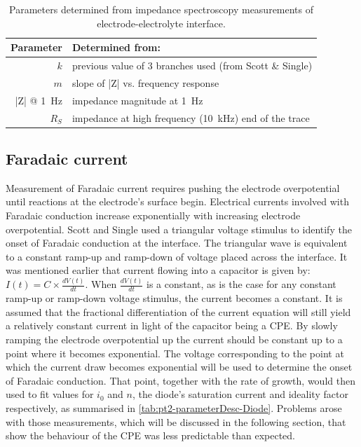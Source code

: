     \begin{table}
      \begin{center}
        \begin{tabular} {r | l}
          Parameter & Determined from:\\
          \hline
          $k$ & previous value of 3 branches used (from Scott \& Single)\\
          $m$ & slope of |Z| vs. frequency response\\
          |Z| @ \SI{1}{\hertz} & impedance magnitude at \SI{1}{\hertz}\\
          $R_S$ & impedance at high frequency (\SI{10}{\kilo\hertz}) end of the trace
        \end{tabular}
      \end{center}
      \caption{\label{tab:pt2-parameterDesc-CPE}Parameters determined from impedance spectroscopy measurements of electrode-electrolyte interface.}
    \end{table}


  \subsection{Faradaic current}


    Measurement of Faradaic current requires pushing the electrode overpotential until reactions at the electrode's surface begin.
    Electrical currents involved with Faradaic conduction increase exponentially with increasing electrode overpotential.
    Scott and Single used a triangular voltage stimulus to identify the onset of Faradaic conduction at the interface.
    The triangular wave is equivalent to a constant ramp-up and ramp-down of voltage placed across the interface.
    It was mentioned earlier that current flowing into a capacitor is given by: $I(t) = C \times \frac{dV(t)}{dt}$.
    When $\frac{dV(t)}{dt}$ is a constant, as is the case for any constant ramp-up or ramp-down voltage stimulus, the current becomes a constant.
    It is assumed that the fractional differentiation of the current equation will still yield a relatively constant current in light of the capacitor being a CPE.
    By slowly ramping the electrode overpotential up the current should be constant up to a point where it becomes exponential.
    The voltage corresponding to the point at which the current draw becomes exponential will be used to determine the onset of Faradaic conduction.
    That point, together with the rate of growth, would then used to fit values for $i_0$ and $n$, the diode's saturation current and ideality factor respectively, as summarised in \cref{tab:pt2-parameterDesc-Diode}.
    Problems arose with those measurements, which will be discussed in the following section, that show the behaviour of the CPE was less predictable than expected.


